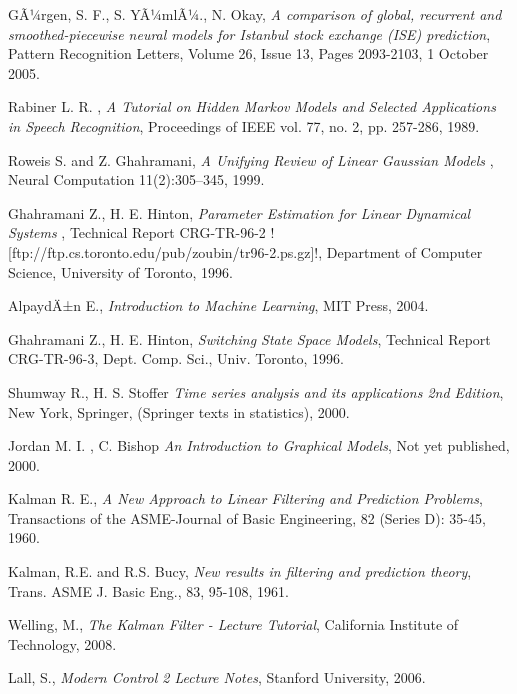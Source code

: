
\begin{thebibliography}{99}
  
 GÃ¼rgen, S. F., S. YÃ¼mlÃ¼., N. Okay,
  {\em A comparison of global, recurrent and smoothed-piecewise neural models
    for Istanbul stock exchange (ISE) prediction}, 
  Pattern Recognition Letters, Volume 26, Issue 13, Pages 2093-2103, 
  1 October 2005.

 Rabiner L. R. , 
  {\em A Tutorial on Hidden Markov Models and Selected Applications in Speech Recognition}, 
  Proceedings of IEEE vol. 77, no. 2, pp. 257-286, 
  1989.

 Roweis S. and Z. Ghahramani,
  {\em  A Unifying Review of Linear Gaussian Models },
   Neural Computation 11(2):305--345, 
   1999.
   
 Ghahramani Z., H. E. Hinton, 
  {\em Parameter Estimation for Linear Dynamical Systems },
   Technical Report CRG-TR-96-2  
   \PVerb![ftp://ftp.cs.toronto.edu/pub/zoubin/tr96-2.ps.gz]!,
   Department of Computer Science, University of Toronto, 
   1996.

 AlpaydÄ±n E., 
  {\em Introduction to Machine Learning},
  MIT Press, 
  2004.   
   
 Ghahramani Z., H. E. Hinton,
  {\em Switching State Space Models},
  Technical Report CRG-TR-96-3, Dept. Comp. Sci., Univ. Toronto, 
  1996.
   
 Shumway R., H. S. Stoffer
  {\em Time series analysis and its applications 2nd Edition},
   New York, Springer, (Springer texts in statistics),
   2000.
   
 Jordan M. I. , C. Bishop
  {\em An Introduction to Graphical Models},
   Not yet published, 
   2000.

 Kalman R. E.,
  {\em A New Approach to Linear Filtering and Prediction Problems},
  Transactions of the ASME-Journal of Basic Engineering, 82 (Series D): 35-45, 
  1960.

 Kalman, R.E. and R.S. Bucy, 
  {\em New results in filtering and prediction theory},
  Trans. ASME J. Basic Eng., 83, 95-108,
  1961.
  
 Welling, M.,
  {\em The Kalman Filter - Lecture Tutorial},
   California Institute of Technology,
   2008.
   
 Lall, S.,
  {\em Modern Control 2 Lecture Notes},
   Stanford University,
   2006.
   

\end{thebibliography}
